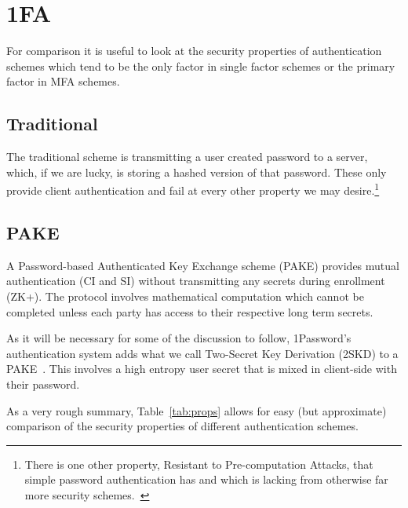 \documentclass{soups}
\newcommand{\prop}[1]{\textsf{#1}}
\begin{document}
\section{1FA}

For comparison it is useful to look at the security properties
of authentication schemes which tend to be the only factor in single
factor schemes or the primary factor in MFA schemes.

\subsection{Traditional}
The traditional scheme is transmitting a user created password to a server, which, if we are lucky, is storing a hashed version of that password. These only provide client authentication and fail at every other property we may desire.\footnote{There is one other property, Resistant to Pre-computation Attacks, that simple password authentication has and which is lacking from otherwise far more security schemes.~\autocite{JareckiETAL2018:OPAQUE}}

\subsection{PAKE}
A Password-based Authenticated Key Exchange scheme (PAKE) provides mutual authentication (\prop{CI} and \prop{SI}) without transmitting any secrets during enrollment (\prop{ZK+}). The protocol involves mathematical computation which cannot be completed unless each party has access to their respective long term secrets.

As it will be necessary for some of the discussion to follow,
1Password's authentication system adds what we call
Two-Secret Key Derivation (2SKD) to a PAKE~\autocite{1Password:whitepaper}.
This involves a
high entropy user secret that is mixed in client-side with their password.

As a very rough summary, Table~\ref{tab:props} allows for easy
(but approximate) comparison of the security properties of different
authentication schemes.
\end{document}
